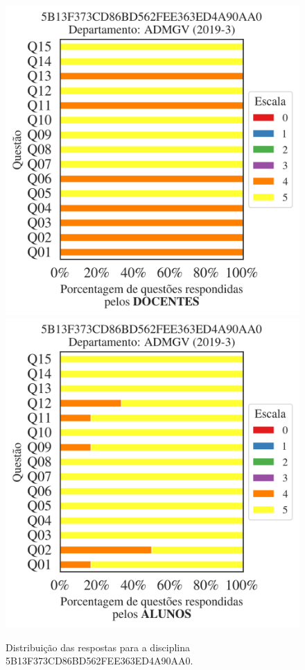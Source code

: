 \documentclass[a4paper,10pt]{article}
\begin{document}
\begin{figure}[h]
\centering
\includegraphics[width=0.485\linewidth]{analise_disciplina_departamento_ADMGV_5B13F373CD86BD562FEE363ED4A90AA0_docentes.png}
\includegraphics[width=0.485\linewidth]{analise_disciplina_departamento_ADMGV_5B13F373CD86BD562FEE363ED4A90AA0_alunos.png}
\caption{\label{fig:analise_geral_departamento}                Distribuição das respostas para a disciplina 5B13F373CD86BD562FEE363ED4A90AA0. }
\end{figure}
\end{document}
